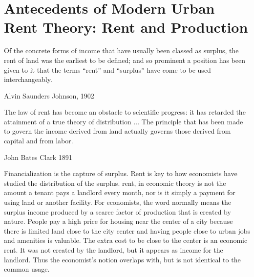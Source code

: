 \chapter{Antecedents of Modern Urban Rent Theory: Rent and Production} \label{chapter-rent}

\epigraph{Of the concrete forms of income that have usually been classed as surplus, the rent of land was the earliest to be defined; and so prominent a position has been given to it that the terms ``rent'' and ``surplus'' have come to be used interchangeably.}{Alvin Saunders Johnson, 1902 \cite{johnsonRentModernEconomic1902}}
\epigraph{The law of rent has become an obstacle to scientific progress: it has retarded the attainment of a true theory of distribution ... %
The principle that has been made to govern the income derived from land actually governs those derived from capital and from labor. 
}{John Bates Clark 1891 \cite{clarkDistributionDeterminedLaw1891}}

Financialization is the capture of surplus. Rent is key to how economists have studied the distribution of the surplus. %
\Gls{rent}, in economic theory is not the amount a tenant pays a landlord every month, nor is it simply a payment for using land or another facility.  For economists, the word normally means the \gls{surplus} income produced by a scarce factor of production that is created by nature. People pay a high price for housing near the center of a city because there is limited %
land close to the city center and having people close to urban jobs and amenities is valuable. The extra cost to be close to the center is an \gls{economic rent}. It was not created by the landlord, but it appears as income for the landlord. Thus the economist's notion overlaps with, but is not identical to the common usage. 

